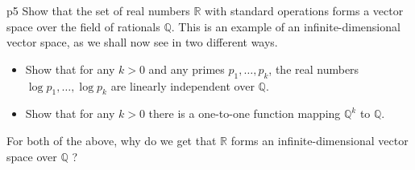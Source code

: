 \documentclass[a4paper, 11pt]{article}
\begin{document}

\begin{problem}{%
}{p5%
}
Show that the set of real numbers $\mathbb{R}$ with standard operations forms a vector space over the field of rationals $\mathbb{Q}$. This is an example of an infinite-dimensional vector space, as we shall now see in two different ways.
\begin{itemize}
	\item Show that for any $k>0$ and any primes $p_1, \ldots, p_k$, the real numbers $\log p_1, \ldots, \log p_k$ are linearly independent over $\mathbb{Q}$.
	\item Show that for any $k>0$ there is a one-to-one function mapping $\mathbb{Q}^k$ to $\mathbb{Q}$.
\end{itemize}

For both of the above, why do we get that $\mathbb{R}$ forms an infinite-dimensional vector space over $\mathbb{Q}$ ?
\end{problem}
\end{document}
